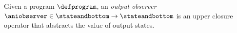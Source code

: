 Given a program $\defprogram$, an \emph{output observer} $\aniobserver\in \stateandbottom \to \stateandbottom$ is an upper closure operator that abstracts the value of output states.
